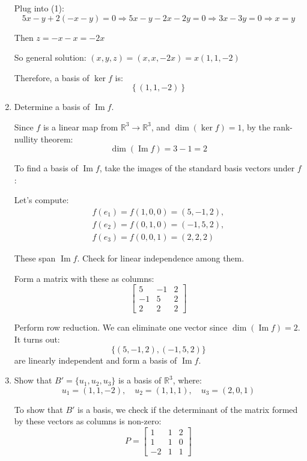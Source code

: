 \documentclass[12pt]{article}
\begin{document}
\begin{answerbox}
\begin{enumerate}
  Plug into (1):
  $$
  5x - y + 2(-x - y) = 0 \Rightarrow 5x - y - 2x - 2y = 0 \Rightarrow 3x - 3y = 0 \Rightarrow x = y
  $$

  Then $ z = -x - x = -2x $

  So general solution: $ (x, y, z) = (x, x, -2x) = x(1, 1, -2) $

  Therefore, a basis of $ \ker f $ is:
  $$
  \left\{(1, 1, -2)\right\}
  $$

  \item Determine a basis of $ \operatorname{Im} f $.

  Since $ f $ is a linear map from $ \mathbb{R}^3 \to \mathbb{R}^3 $, and $ \dim(\ker f) = 1 $, by the rank-nullity theorem:
  $$
  \dim(\operatorname{Im} f) = 3 - 1 = 2
  $$

  To find a basis of $ \operatorname{Im} f $, take the images of the standard basis vectors under $ f $:

  Let’s compute:
  $$
  \begin{align*}
  f(e_1) = f(1, 0, 0) = (5, -1, 2), \\
  f(e_2) = f(0, 1, 0) = (-1, 5, 2), \\
  f(e_3) = f(0, 0, 1) = (2, 2, 2)
  \end{align*}
  $$

  These span $ \operatorname{Im} f $. Check for linear independence among them.

  Form a matrix with these as columns:
  $$
  \begin{bmatrix}
  5 & -1 & 2 \\
  -1 & 5 & 2 \\
  2 & 2 & 2
  \end{bmatrix}
  $$

  Perform row reduction. We can eliminate one vector since $ \dim(\operatorname{Im} f) = 2 $. It turns out:
  $$
  \{(5, -1, 2), (-1, 5, 2)\}
  $$
  are linearly independent and form a basis of $ \operatorname{Im} f $.

  \item Show that $ B' = \{u_1, u_2, u_3\} $ is a basis of $ \mathbb{R}^3 $, where:
  $$
  u_1 = (1, 1, -2),\quad u_2 = (1, 1, 1),\quad u_3 = (2, 0, 1)
  $$

  To show that $ B' $ is a basis, we check if the determinant of the matrix formed by these vectors as columns is non-zero:
  $$
  P = \begin{bmatrix}
  1 & 1 & 2 \\
  1 & 1 & 0 \\
  -2 & 1 & 1
  \end{bmatrix}
  $$


\end{enumerate}
\end{answerbox}
\end{document}
